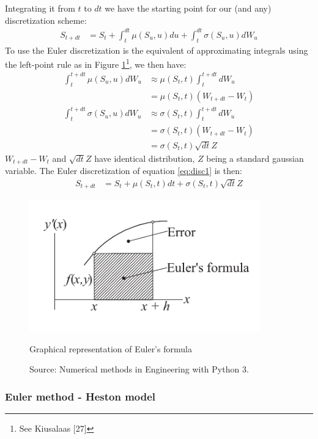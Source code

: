 \documentclass[12pt,twoside]{reedthesis}
\theoremstyle{definition}
\theoremstyle{definition}
\theoremstyle{remark}
\begin{document}
  Integrating it from \(t\) to \(dt\) we have the starting point for our
  (and any) discretization scheme:
  \begin{align}
  \label{eq:disc1}
  S_{t+dt} &= S_t + \int_{t}^{dt}{\mu(S_u,u)}du + \int_{t}^{dt}{\sigma(S_u,u)} dW_u
  \end{align}
  To use the Euler discretization is the equivalent of approximating
  integrals using the left-point rule as in Figure
  \ref{graph_euler}\footnote{See Kiusalaas {[}27{]}}, we then have:
  \begin{align*}
   \int_{t}^{t+dt}{\mu(S_u,u)} dW_u &\approx \mu(S_t,t) \int_{t}^{t+dt}dW_u\\
  &= \mu(S_t,t) (W_{t+dt} - W_t)  \\
   \int_{t}^{t+dt}{\sigma(S_u,u)} dW_u &\approx \sigma(S_t,t) \int_{t}^{t+dt}dW_u\\
  &= \sigma(S_t,t) (W_{t+dt} - W_t)  \\
  &= \sigma(S_t,t) \sqrt{dt} Z
  \end{align*}
  \(W_{t+dt}-W_t\) and \(\sqrt{dt}Z\) have identical distribution, \(Z\)
  being a standard gaussian variable. The Euler discretization of equation
  \eqref{eq:disc1} is then:
  \begin{align}
  \label{eq:disc2}
  S_{t+dt} &= S_t + \mu(S_t,t)dt + \sigma(S_t,t)\sqrt{dt}Z
  \end{align}
  \begin{figure}
  \begin{center}
      \includegraphics[width=100mm]{figure/euler_screen.png}
      \caption{Graphical representation of Euler’s formula}\label{graph_euler}
      \caption*{\scriptsize{Source: Numerical methods in Engineering with Python 3.}}
  \end{center}
  \end{figure}
  \subsubsection{Euler method - Heston
  model}\label{euler-method---heston-model}
  
\end{document}
